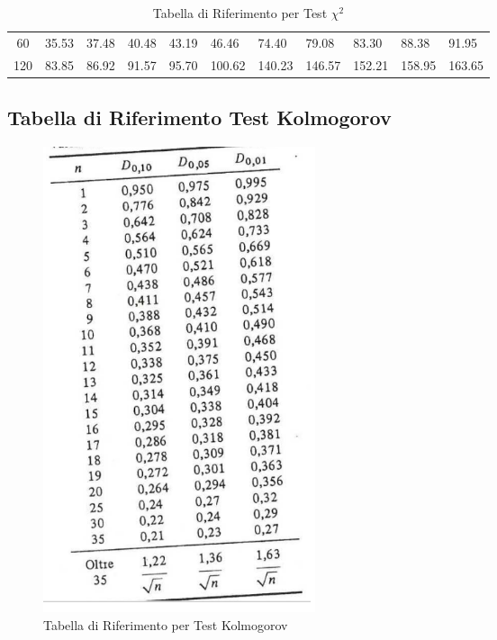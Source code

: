 \begin{table}[H]
{\begin{tabular}{ c | l l l l l l l l l l}
            60                   & 35.53                  & 37.48              & 40.48                  & 43.19                & 46.46                 & 74.40                 & 79.08                 & 83.30                   & 88.38                 & 91.95                   \\
            120                  & 83.85                  & 86.92              & 91.57                  & 95.70                & 100.62                & 140.23                & 146.57                & 152.21                  & 158.95                & 163.65                  \\
        \end{tabular}}
    \caption{Tabella di Riferimento per Test $\chi^2$}
\end{table}

\subsection{Tabella di Riferimento Test Kolmogorov} \label{tabella-kolmogorov}

\begin{figure}[H]
    \centering
    \includegraphics[width=8cm, keepaspectratio]{capitoli/goodnes_of_fit/imgs/kolmtable.png}
    \caption{Tabella di Riferimento per Test Kolmogorov}
    \label{kolmogorov-tabella}
\end{figure}

